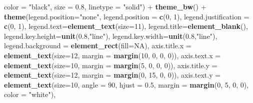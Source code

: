 \documentclass[]{article}
\newenvironment{Shaded}{\begin{snugshade}}{\end{snugshade}}
\newcommand{\KeywordTok}[1]{\textcolor[rgb]{0.13,0.29,0.53}{\textbf{{#1}}}}
\newcommand{\DataTypeTok}[1]{\textcolor[rgb]{0.13,0.29,0.53}{{#1}}}
\newcommand{\DecValTok}[1]{\textcolor[rgb]{0.00,0.00,0.81}{{#1}}}
\newcommand{\FloatTok}[1]{\textcolor[rgb]{0.00,0.00,0.81}{{#1}}}
\newcommand{\StringTok}[1]{\textcolor[rgb]{0.31,0.60,0.02}{{#1}}}
\newcommand{\OtherTok}[1]{\textcolor[rgb]{0.56,0.35,0.01}{{#1}}}
\newcommand{\NormalTok}[1]{{#1}}
\begin{document}
\begin{Shaded}
\begin{Highlighting}[]
                         \DataTypeTok{color =} \StringTok{"black"}\NormalTok{, }\DataTypeTok{size =} \FloatTok{0.8}\NormalTok{, }\DataTypeTok{linetype =} \StringTok{"solid"}\NormalTok{) +}
\StringTok{          }\KeywordTok{theme_bw}\NormalTok{() +}
\StringTok{          }\KeywordTok{theme}\NormalTok{(}\DataTypeTok{legend.position=}\StringTok{"none"}\NormalTok{,}
                \DataTypeTok{legend.position =} \KeywordTok{c}\NormalTok{(}\DecValTok{0}\NormalTok{, }\DecValTok{1}\NormalTok{), }
                \DataTypeTok{legend.justification =} \KeywordTok{c}\NormalTok{(}\DecValTok{0}\NormalTok{, }\DecValTok{1}\NormalTok{),}
                \DataTypeTok{legend.text=}\KeywordTok{element_text}\NormalTok{(}\DataTypeTok{size=}\DecValTok{11}\NormalTok{),}
                \DataTypeTok{legend.title=}\KeywordTok{element_blank}\NormalTok{(),}
                \DataTypeTok{legend.key.height=}\KeywordTok{unit}\NormalTok{(}\FloatTok{0.8}\NormalTok{,}\StringTok{"line"}\NormalTok{),}
                \DataTypeTok{legend.key.width=}\KeywordTok{unit}\NormalTok{(}\FloatTok{0.8}\NormalTok{,}\StringTok{"line"}\NormalTok{),}
                \DataTypeTok{legend.background =} \KeywordTok{element_rect}\NormalTok{(}\DataTypeTok{fill=}\OtherTok{NA}\NormalTok{),}
                \DataTypeTok{axis.title.x =} \KeywordTok{element_text}\NormalTok{(}\DataTypeTok{size=}\DecValTok{12}\NormalTok{, }\DataTypeTok{margin =} \KeywordTok{margin}\NormalTok{(}\DecValTok{10}\NormalTok{, }\DecValTok{0}\NormalTok{, }\DecValTok{0}\NormalTok{, }\DecValTok{0}\NormalTok{)),}
                \DataTypeTok{axis.text.x  =} \KeywordTok{element_text}\NormalTok{(}\DataTypeTok{size=}\DecValTok{10}\NormalTok{, }\DataTypeTok{margin =} \KeywordTok{margin}\NormalTok{(}\DecValTok{5}\NormalTok{, }\DecValTok{0}\NormalTok{, }\DecValTok{0}\NormalTok{, }\DecValTok{0}\NormalTok{)), }
                \DataTypeTok{axis.title.y =} \KeywordTok{element_text}\NormalTok{(}\DataTypeTok{size=}\DecValTok{12}\NormalTok{, }\DataTypeTok{margin =} \KeywordTok{margin}\NormalTok{(}\DecValTok{0}\NormalTok{, }\DecValTok{15}\NormalTok{, }\DecValTok{0}\NormalTok{, }\DecValTok{0}\NormalTok{)),}
                \DataTypeTok{axis.text.y  =} \KeywordTok{element_text}\NormalTok{(}\DataTypeTok{size=}\DecValTok{10}\NormalTok{, }\DataTypeTok{angle =} \DecValTok{90}\NormalTok{, }\DataTypeTok{hjust =} \FloatTok{0.5}\NormalTok{, }
                                            \DataTypeTok{margin =} \KeywordTok{margin}\NormalTok{(}\DecValTok{0}\NormalTok{, }\DecValTok{5}\NormalTok{, }\DecValTok{0}\NormalTok{, }\DecValTok{0}\NormalTok{), }\DataTypeTok{color =} \StringTok{"white"}\NormalTok{),}

\end{Highlighting}
\end{Shaded}
\end{document}

